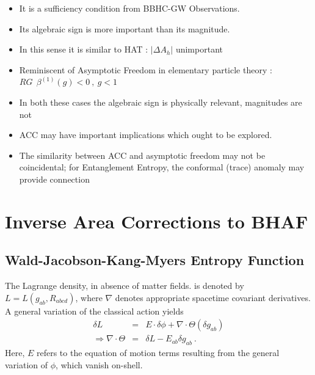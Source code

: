 \documentclass[11pt]{article}
\begin{document}
\begin{itemize}
\item {It is a sufficiency condition from BBHC-GW Observations.}
\item {Its algebraic sign is more important than its magnitude.}
\item {In this sense it is similar to HAT : $|\Delta A_h|$ unimportant}
\item {Reminiscent of Asymptotic Freedom in elementary particle theory : $ RG~~  \beta^{(1)}(g) < 0~,~ g < 1 $}
\item {In both these cases the algebraic sign is physically relevant, magnitudes are not}
\item {ACC may have important implications which ought to be explored. }
\item {The similarity between ACC and asymptotic freedom may not be coincidental; for Entanglement Entropy, the conformal (trace) anomaly may provide connection}
\end{itemize}

\section{Inverse Area Corrections to BHAF} 

\subsection{Wald-Jacobson-Kang-Myers Entropy Function}

The Lagrange density, in absence of matter fields. is denoted by $L=L(g_{ab}, R_{abcd})$, where $\nabla$ denotes appropriate spacetime covariant derivatives. A general variation of the classical action yields 
\begin{eqnarray}
\delta L &=& E\cdot \delta \phi + \nabla \cdot \Theta(\delta g_{ab}) \nonumber \\
\Rightarrow \nabla \cdot \Theta &=& \delta L - E_{ab} \delta g_{ab}~. \label{gen}
\end{eqnarray}         
Here, $E$ refers to the equation of motion terms resulting from the general variation of $\phi$, which vanish on-shell.
\end{document}
